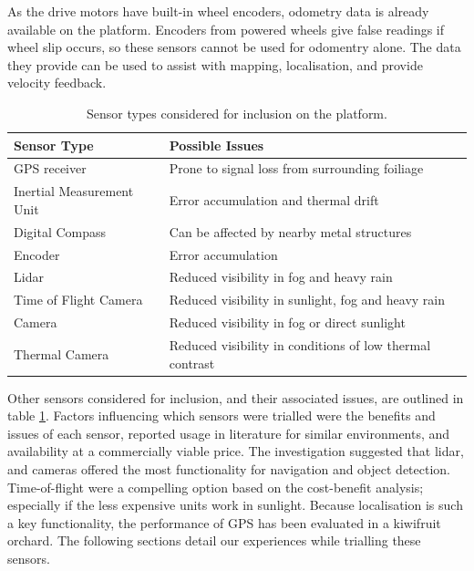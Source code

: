 \documentclass[preprint,authoryear,12pt]{elsarticle}
\begin{document}
    As the drive motors have built-in wheel encoders, odometry data is already available on the platform.
    Encoders from powered wheels give false readings if wheel slip occurs, so these sensors cannot be used for odomentry alone.
    The data they provide can be used to assist with mapping, localisation, and provide velocity feedback.

    \begin{table}[htbp]
        \centering
        \footnotesize
        \begin{tabular}{ l l}
            \textbf{Sensor Type}      &\textbf{Possible Issues} \\ \hline
            GPS receiver              & Prone to signal loss from surrounding foiliage\\  \hline
            Inertial Measurement Unit & Error accumulation and thermal drift\\ \hline
            Digital Compass           & Can be affected by nearby metal structures\\ \hline
            Encoder                   & Error accumulation \\ \hline
            Lidar                     & Reduced visibility in fog and heavy rain \\ \hline
            Time of Flight Camera     & Reduced visibility in sunlight, fog and heavy rain \\ \hline
            Camera                    & Reduced visibility in fog or direct sunlight \\ \hline
            Thermal Camera            & Reduced visibility in conditions of low thermal contrast\\ \hline
        \end{tabular}
        \label{table:sensor_comparison}
        \caption{Sensor types considered for inclusion on the platform.}
    \end{table}

    Other sensors considered for inclusion, and their associated issues, are outlined in table \ref{table:sensor_comparison}.
    Factors influencing which sensors were trialled were the benefits and issues of each sensor, reported usage in literature for similar environments, and availability at a commercially viable price.
    The investigation suggested that lidar, and cameras offered the most functionality for navigation and object detection.
    Time-of-flight were a compelling option based on the cost-benefit analysis; especially if the less expensive units work in sunlight.
    Because localisation is such a key functionality, the performance of GPS has been evaluated in a kiwifruit orchard.
    The following sections detail our experiences while trialling these sensors.
\end{document}
